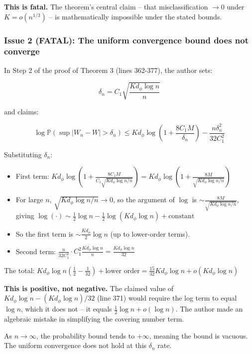 \documentclass[
  12pt,
]{ctexart}
\providecommand{\tightlist}{%
  \setlength{\itemsep}{0pt}\setlength{\parskip}{0pt}}
\begin{document}
\textbf{This is fatal.} The theorem's central claim -- that
misclassification \(\to 0\) under \(K = o(n^{1/3})\) -- is
mathematically impossible under the stated bounds.

\subsubsection{Issue 2 (FATAL): The uniform convergence bound does not
converge}\label{issue-2-fatal-the-uniform-convergence-bound-does-not-converge}

In Step 2 of the proof of Theorem 3 (lines 362-377), the author sets:

\[\delta_n = C_1 \sqrt{\frac{K d_\phi \log n}{n}}\]

and claims:

\[\log \mathbb{P}(\sup |W_n - W| > \delta_n) \leq K d_\phi \log\left(1 + \frac{8C_1 M}{\delta_n}\right) - \frac{n \delta_n^2}{32 C_1^2}\]

Substituting \(\delta_n\):

\begin{itemize}
\tightlist
\item
  First term:
  \(K d_\phi \log\left(1 + \frac{8C_1 M}{C_1 \sqrt{K d_\phi \log n / n}}\right) = K d_\phi \log\left(1 + \frac{8M}{\sqrt{K d_\phi \log n / n}}\right)\)
\item
  For large \(n\), \(\sqrt{K d_\phi \log n / n} \to 0\), so the argument
  of \(\log\) is \(\sim \frac{8M}{\sqrt{K d_\phi \log n / n}}\), giving
  \(\log(\cdot) \sim \frac{1}{2} \log n - \frac{1}{2} \log(K d_\phi \log n) + \text{constant}\)
\item
  So the first term is \(\sim \frac{K d_\phi}{2} \log n\) (up to
  lower-order terms).
\item
  Second term:
  \(\frac{n}{32 C_1^2} \cdot C_1^2 \frac{K d_\phi \log n}{n} = \frac{K d_\phi \log n}{32}\)
\end{itemize}

The total:
\(K d_\phi \log n \left(\frac{1}{2} - \frac{1}{32}\right) + \text{lower order} = \frac{15}{32} K d_\phi \log n + o(K d_\phi \log n)\)

\textbf{This is positive, not negative.} The claimed value of
\(K d_\phi \log n - (K d_\phi \log n)/32\) (line 371) would require the
log term to equal \(\log n\), which it does not -- it equals
\(\frac{1}{2}\log n + o(\log n)\). The author made an algebraic mistake
in simplifying the covering number term.

As \(n \to \infty\), the probability bound tends to \(+\infty\), meaning
the bound is vacuous. The uniform convergence does not hold at this
\(\delta_n\) rate.
\end{document}
